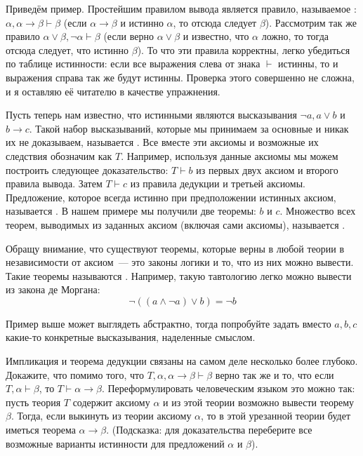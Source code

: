 Приведём пример. Простейшим правилом вывода является правило, называемое : $\alpha, \alpha\to\beta \vdash \beta$ (если $\alpha\to\beta$ и истинно $\alpha$, то отсюда следует $\beta$). Рассмотрим так же правило $\alpha\lor\beta, \neg\alpha \vdash \beta$ (если верно $\alpha\lor\beta$ и известно, что $\alpha$ ложно, то тогда отсюда следует, что истинно $\beta$). То что эти правила корректны, легко убедиться по таблице истинности: если все выражения слева от знака $\vdash$ истинны, то и выражения справа так же будут истинны. Проверка этого совершенно не сложна, и я оставляю её читателю в качестве упражнения.

Пусть теперь нам известно, что истинными являются высказывания $\neg a, a\lor b$ и $b\to c$. Такой набор высказываний, которые мы принимаем за основные и никак их не доказываем, называется . Все вместе эти аксиомы и возможные их следствия обозначим как $T$. Например, используя данные аксиомы мы можем построить следующее доказательство: $T\vdash b$ из первых двух аксиом и второго правила вывода. Затем $T\vdash c$ из правила дедукции и третьей аксиомы. Предложение, которое всегда истинно при предположении истинных аксиом, называется . В нашем примере мы получили две теоремы: $b$ и $c$. Множество всех теорем, выводимых из заданных аксиом (включая сами аксиомы), называется .

Обращу внимание, что существуют теоремы, которые верны в любой теории в независимости от аксиом~--- это законы логики и то, что из них можно вывести. Такие теоремы называются . Например, такую тавтологию легко можно вывести из закона де Моргана:
$$\neg((a\land \neg a)\lor b) = \neg b$$

\begin{exercise}
Пример выше может выглядеть абстрактно, тогда попробуйте задать вместо $a, b, c$ какие-то конкретные высказывания, наделенные смыслом.
\end{exercise}

\begin{exercise}
Импликация и теорема дедукции связаны на самом деле несколько более глубоко. Докажите, что помимо того, что $T, \alpha, \alpha\to\beta\vdash \beta$ верно так же и то, что если $T, \alpha \vdash \beta$, то $T \vdash \alpha\to\beta$. Переформулировать человеческим языком это можно так: пусть теория $T$ содержит аксиому $\alpha$ и из этой теории возможно вывести теорему $\beta$. Тогда, если выкинуть из теории аксиому $\alpha$, то в этой урезанной теории будет иметься теорема $\alpha\to\beta$. (Подсказка: для доказательства переберите все возможные варианты истинности для предложений $\alpha$ и $\beta$).
\end{exercise}

